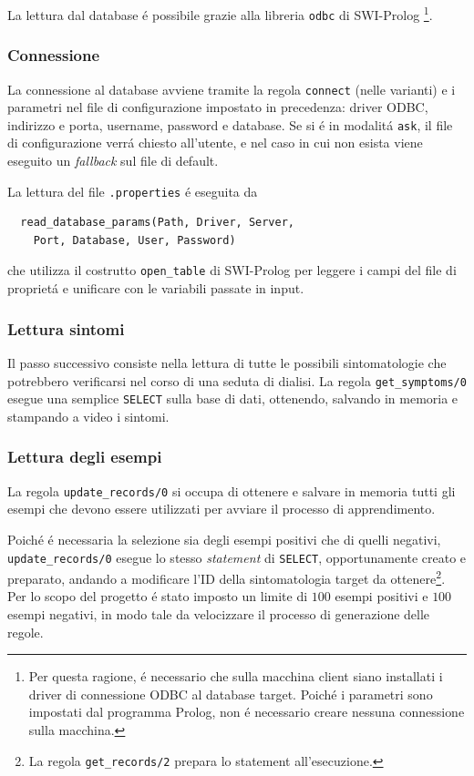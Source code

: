 \documentclass[preprint]{acm_proc_article-sp}
\begin{document}
La lettura dal database \'e possibile grazie alla libreria \verb|odbc| di SWI-Prolog \footnote{Per questa ragione, \'e necessario che sulla macchina client siano installati i driver di connessione ODBC al database target. Poich\'e i parametri sono impostati dal programma Prolog, non \'e necessario creare nessuna connessione sulla macchina.}.

\subsubsection{Connessione}
La connessione al database avviene tramite la regola \verb|connect| (nelle varianti) e i parametri nel file di configurazione impostato in precedenza: driver ODBC, indirizzo e porta, username, password e database. Se si \'e in modalit\'a \verb|ask|, il file di configurazione verr\'a chiesto all'utente, e nel caso in cui non esista viene eseguito un \textit{fallback} sul file di default.

La lettura del file \verb|.properties| \'e eseguita da
\begin{verbatim}
  read_database_params(Path, Driver, Server, 
  	Port, Database, User, Password)
\end{verbatim}
che utilizza il costrutto \verb|open_table| di SWI-Prolog per leggere i campi del file di propriet\'a e unificare con le variabili passate in input.

\subsubsection{Lettura sintomi}
Il passo successivo consiste nella lettura di tutte le possibili sintomatologie che potrebbero verificarsi nel corso di una seduta di dialisi. La regola \verb|get_symptoms/0| esegue una semplice \texttt{SELECT} sulla base di dati, ottenendo, salvando in memoria e stampando a video i sintomi.

\subsubsection{Lettura degli esempi}
La regola \verb|update_records/0| si occupa di ottenere e salvare in memoria tutti gli esempi che devono essere utilizzati per avviare il processo di apprendimento.

Poich\'e \'e necessaria la selezione sia degli esempi positivi che di quelli negativi, \verb|update_records/0| esegue lo stesso \textit{statement} di \texttt{SELECT}, opportunamente creato e preparato, andando a modificare l'ID della sintomatologia target da ottenere\footnote{La regola \verb|get_records/2| prepara lo statement all'esecuzione.}. Per lo scopo del progetto \'e stato imposto un limite di $100$ esempi positivi e $100$ esempi negativi, in modo tale da velocizzare il processo di generazione delle regole.
\end{document}
